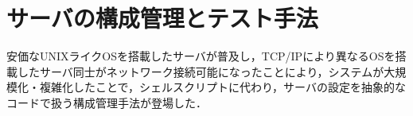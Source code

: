 \section{サーバの構成管理とテスト手法}

安価なUNIXライクOSを搭載したサーバが普及し，TCP/IPにより異なるOSを搭載したサーバ同士がネットワーク接続可能になったことにより，システムが大規模化・複雑化したことで，シェルスクリプトに代わり，サーバの設定を抽象的なコードで扱う構成管理手法が登場した．\cite{cfengine paper1}

